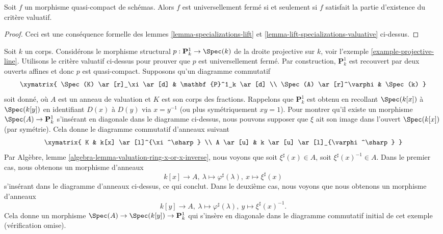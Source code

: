 \begin{proposition}
\label{proposition-characterize-universally-closed}
Soit $f$ un morphisme quasi-compact de schémas.
Alors $f$ est universellement fermé si et seulement
si $f$ satisfait la partie d'existence du critère valuatif.
\end{proposition}

\begin{proof}
Ceci est une conséquence formelle
des lemmes \ref{lemma-specializations-lift} et
\ref{lemma-lift-specializations-valuative} ci-dessus.
\end{proof}

\begin{example}
\label{example-projective-line-universally-closed}
Soit $k$ un corps. Considérons le morphisme structural $p
: \mathbf{P}^1_k \to \Spec(k)$ de la droite projective
sur $k$, voir l'exemple \ref{example-projective-line}. Utilisons
le critère valuatif ci-dessus pour prouver que $p$ est universellement
fermé. Par
construction, $\mathbf{P}^1_k$ est recouvert par deux ouverts
affines et donc $p$ est quasi-compact. Supposons
qu'un diagramme commutatif
$$
\xymatrix{
\Spec(K) \ar[r]_\xi \ar[d] & \mathbf{P}^1_k \ar[d] \\
\Spec(A) \ar[r]^\varphi & \Spec(k)
}
$$
soit donné, où $A$ est un anneau de valuation et $K$ est son corps
des fractions. Rappelons que $\mathbf{P}^1_k$ est obtenu en recollant
$\Spec(k[x])$ à $\Spec(k[y])$ en identifiant $D(x)$
à $D(y)$ via $x = y^{-1}$ (ou plus symétriquement $xy = 1$). Pour montrer
qu'il existe un morphisme $\Spec(A) \to \mathbf{P}^1_k$ s'insérant
en diagonale dans le diagramme ci-dessus, nous pouvons supposer que $\xi$
ait son image dans l'ouvert $\Spec(k[x])$ (par symétrie). Cela donne le diagramme
commutatif d'anneaux suivant
$$
\xymatrix{
K & k[x] \ar[l]^{\xi^\sharp} \\
A \ar[u] & k \ar[u] \ar[l]_{\varphi^\sharp}
}
$$
Par Algèbre, lemme \ref{algebra-lemma-valuation-ring-x-or-x-inverse}, nous voyons
que soit $\xi^\sharp(x)
\in A$, soit $\xi^\sharp(x)^{-1} \in A$. Dans le premier
cas, nous obtenons un morphisme d'anneaux
$$
k[x] \to A,
\ \lambda \mapsto \varphi^\sharp(\lambda),
\ x \mapsto \xi^\sharp(x)
$$
s'insérant dans le diagramme d'anneaux ci-dessus, ce qui conclut. Dans
le deuxième cas, nous voyons que nous obtenons un morphisme d'anneaux
$$
k[y] \to A,
\ \lambda \mapsto \varphi^\sharp(\lambda),
\ y \mapsto \xi^\sharp(x)^{-1}.
$$
Cela donne un morphisme
$\Spec(A) \to \Spec(k[y]) \to \mathbf{P}^1_k$ qui
s'insère en diagonale dans le diagramme commutatif initial de cet exemple
(vérification omise).
\end{example}





























